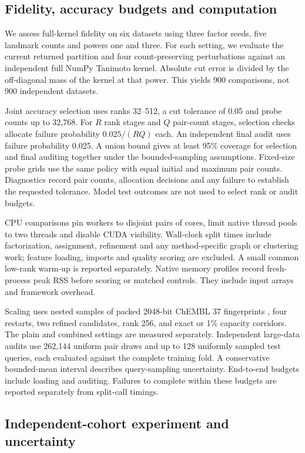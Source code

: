 \documentclass[12pt]{article}
\begin{document}
\subsection{Fidelity, accuracy budgets and computation}

We assess full-kernel fidelity on six datasets using three factor seeds, five
landmark counts and powers one and three. For each setting, we evaluate the
current returned partition and four count-preserving perturbations against an
independent full NumPy Tanimoto kernel. Absolute cut error is divided by the
off-diagonal mass of the kernel at that power. This yields 900 comparisons, not
900 independent datasets.

Joint accuracy selection uses ranks 32--512, a cut tolerance of 0.05 and probe
counts up to 32,768. For $R$ rank stages and $Q$ pair-count stages, selection
checks allocate failure probability $0.025/(RQ)$ each. An independent final
audit uses failure probability 0.025. A union bound gives at least 95\%
coverage for selection and final auditing together under the bounded-sampling
assumptions. Fixed-size probe grids use the same policy with equal initial and
maximum pair counts. Diagnostics record pair counts, allocation decisions and
any failure to establish the requested tolerance. Model test outcomes are not
used to select rank or audit budgets.

CPU comparisons pin workers to disjoint pairs of cores, limit native thread
pools to two threads and disable CUDA visibility. Wall-clock split times
include factorization, assignment, refinement and any method-specific graph or
clustering work; feature loading, imports and quality scoring are excluded. A
small common low-rank warm-up is reported separately. Native memory profiles
record fresh-process peak RSS before scoring or matched controls. They include
input arrays and framework overhead.

Scaling uses nested samples of packed 2048-bit ChEMBL 37 fingerprints
\citep{chembl37}, four restarts, two refined candidates, rank 256, and exact or
1\% capacity corridors. The plain and combined settings are measured
separately. Independent large-data audits use 262,144 uniform pair draws and up
to 128 uniformly sampled test queries, each evaluated against the complete
training fold. A conservative bounded-mean interval describes query-sampling
uncertainty. End-to-end budgets include loading and auditing. Failures to
complete within these budgets are reported separately from split-call timings.

\subsection{Independent-cohort experiment and uncertainty}
\end{document}
